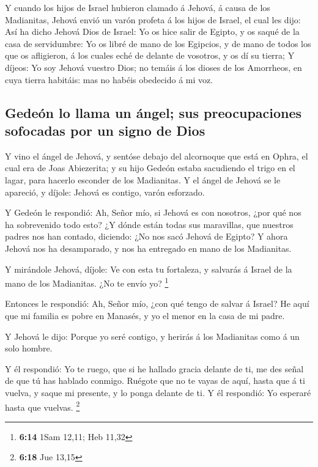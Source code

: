  Y cuando los hijos de Israel hubieron clamado á Jehová, á
causa de los Madianitas,  Jehová envió un varón profeta á
los hijos de Israel, el cual les dijo: Así ha dicho Jehová Dios de
Israel: Yo os hice salir de Egipto, y os saqué de la casa de
servidumbre:  Yo os libré de mano de los Egipcios, y de
mano de todos los que os afligieron, á los cuales eché de delante de
vosotros, y os dí su tierra;  Y díjeos: Yo soy Jehová
vuestro Dios; no temáis á los dioses de los Amorrheos, en cuya tierra
habitáis: mas no habéis obedecido á mi voz.

\hypertarget{gedeuxf3n-lo-llama-un-uxe1ngel-sus-preocupaciones-sofocadas-por-un-signo-de-dios}{%
\subsection{Gedeón lo llama un ángel; sus preocupaciones sofocadas por
un signo de
Dios}\label{gedeuxf3n-lo-llama-un-uxe1ngel-sus-preocupaciones-sofocadas-por-un-signo-de-dios}}

 Y vino el ángel de Jehová, y sentóse debajo del
alcornoque que está en Ophra, el cual era de Joas Abiezerita; y su hijo
Gedeón estaba sacudiendo el trigo en el lagar, para hacerlo esconder de
los Madianitas.  Y el ángel de Jehová se le apareció, y
díjole: Jehová es contigo, varón esforzado.

 Y Gedeón le respondió: Ah, Señor mío, si Jehová es con
nosotros, ¿por qué nos ha sobrevenido todo esto? ¿Y dónde están todas
sus maravillas, que nuestros padres nos han contado, diciendo: ¿No nos
sacó Jehová de Egipto? Y ahora Jehová nos ha desamparado, y nos ha
entregado en mano de los Madianitas.

 Y mirándole Jehová, díjole: Ve con esta tu fortaleza, y
salvarás á Israel de la mano de los Madianitas. ¿No te envío yo?
\footnote{\textbf{6:14} 1Sam 12,11; Heb 11,32}

 Entonces le respondió: Ah, Señor mío, ¿con qué tengo de
salvar á Israel? He aquí que mi familia es pobre en Manasés, y yo el
menor en la casa de mi padre.

 Y Jehová le dijo: Porque yo seré contigo, y herirás á
los Madianitas como á un solo hombre.

 Y él respondió: Yo te ruego, que si he hallado gracia
delante de ti, me des señal de que tú has hablado conmigo.
 Ruégote que no te vayas de aquí, hasta que á ti vuelva,
y saque mi presente, y lo ponga delante de ti. Y él respondió: Yo
esperaré hasta que vuelvas. \footnote{\textbf{6:18} Jue 13,15}

